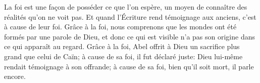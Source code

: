 La foi est une façon de posséder ce que l’on espère,
	un moyen de connaître des réalités qu’on ne voit pas.
Et quand l’Écriture rend témoignage aux anciens, c’est à cause de leur foi.
Grâce à la foi, nous comprenons que les mondes ont été formés par une parole de Dieu,
	et donc ce qui est visible n’a pas son origine dans ce qui apparaît au regard.
Grâce à la foi, Abel offrit à Dieu un sacrifice plus grand que celui de Caïn;
	à cause de sa foi, il fut déclaré juste:
	Dieu lui-même rendait témoignage à son offrande;
	à cause de sa foi, bien qu’il soit mort, il parle encore.
